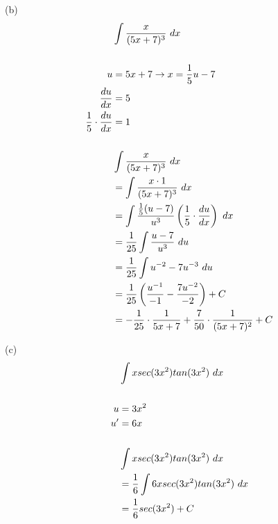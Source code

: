 \begin{exercise}
    (b)
    \begin{align}
                                        & \int {x \over (5x + 7)^3} \ dx                                                        \\
        \\
        u                               & = 5x + 7 \rightarrow x = {1 \over 5}{u - 7}                                           \\
        {du \over dx}                   & = 5                                                                                   \\
        {1 \over 5} \cdot {du \over dx} & = 1                                                                                   \\
        \\
                                        & \int {x \over (5x + 7)^3} \ dx                                                        \\
                                        & = \int {x \cdot 1 \over (5x+7)^3} \ dx                                                \\
                                        & = \int{{1 \over 5}(u - 7) \over u^3}\left({1 \over 5} \cdot {du \over dx}\right) \ dx \\
                                        & = {1 \over 25} \int {u - 7 \over u^3} \ du                                            \\
                                        & = {1 \over 25} \int u^{-2} - 7u^{-3} \ du                                             \\
                                        & = {1 \over 25}\left({u^{-1} \over -1} - {{7u^{-2} \over -2}}\right) + C               \\
                                        & = -{1 \over 25} \cdot {1 \over 5x+7} + {7 \over 50} \cdot {1 \over (5x+7)^2} + C      \\
    \end{align}

    (c)
    \begin{align}
           & \int xsec(3x^2)tan(3x^2) \ dx                \\
        \\
        u  & = 3x^2                                       \\
        u' & = 6x                                         \\
        \\
           & \int xsec(3x^2)tan(3x^2) \ dx                \\
           & = {1 \over 6} \int 6xsec(3x^2)tan(3x^2) \ dx \\
           & = {1 \over 6}sec(3x^2) + C                   \\
    \end{align}


\end{exercise}
